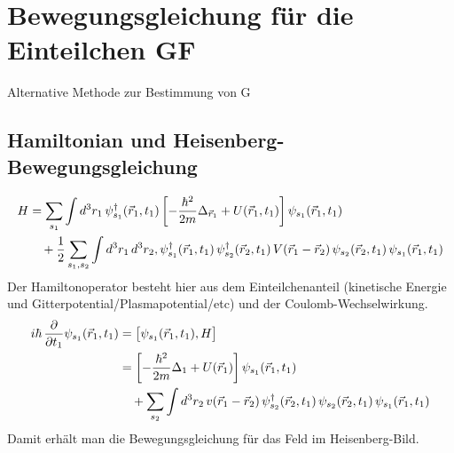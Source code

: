 \section{Bewegungsgleichung für die Einteilchen GF}
Alternative Methode zur Bestimmung von G

\subsection{Hamiltonian und Heisenberg-Bewegungsgleichung}

\begin{align}
  H & = \sum_{s_1} \int d^3r_1 \, \psi_{s_1}^\dagger(\vec r_1,t_1)\left[-\frac{\hbar^2}{2m}\Delta_{\vec r_1} + U(\vec r_1,t_1)\right]\psi_{s_1}(\vec r_1,t_1) \notag                                     \\
    & \quad + \frac12 \sum_{s_1,s_2} \int d^3r_1 \, d^3r_2, \psi_{s_1}^\dagger(\vec r_1,t_1)\,\psi_{s_2}^\dagger(\vec r_2,t_1)\,V(\vec r_1-\vec r_2)\,\psi_{s_2}(\vec r_2,t_1)\,\psi_{s_1}(\vec r_1,t_1)
\end{align}
Der Hamiltonoperator besteht hier aus dem Einteilchenanteil (kinetische Energie und Gitterpotential/Plasmapotential/etc) und der Coulomb-Wechselwirkung.
\begin{align}
  i\hbar\,\frac{\partial}{\partial t_1} \psi_{s_1}(\vec r_1,t_1)
   & = \bigl[\psi_{s_1}(\vec r_1,t_1),H\bigr] \notag                                                                                              \\
   & = \left[-\frac{\hbar^2}{2m}\Delta_{1} + U(\vec r_1)\right]\psi_{s_1}(\vec r_1,t_1) \notag                                                    \\
   & \quad + \sum_{s_2} \int d^3r_2 \, v(\vec r_1-\vec r_2)\,\psi_{s_2}^\dagger(\vec r_2,t_1)\,\psi_{s_2}(\vec r_2,t_1)\,\psi_{s_1}(\vec r_1,t_1)
\end{align}
Damit erhält man die Bewegungsgleichung für das Feld im Heisenberg-Bild.


